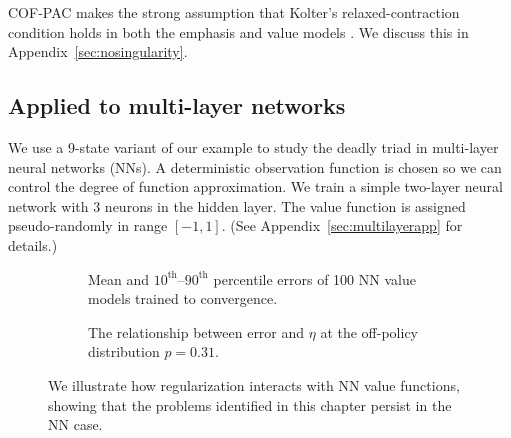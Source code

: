 COF-PAC makes the strong assumption that Kolter's relaxed-contraction condition \cite[eqn.~10]{kolter2011fixed} holds in both the emphasis and value models \cite[asm.~4]{zhang2020provably}. We discuss this in Appendix~\ref{sec:nosingularity}.


\subsection{Applied to multi-layer networks}
\label{sec:multilayer}

We use a 9-state variant of our example to study the deadly triad in multi-layer neural networks (NNs). A deterministic observation function is chosen so we can control the degree of function approximation. We train a simple two-layer neural network with 3 neurons in the hidden layer. The value function is assigned pseudo-randomly in range $[-1, 1]$. (See Appendix~\ref{sec:multilayerapp} for details.)

\begin{figure}
  \begin{subfigure}[t]{0.48\textwidth}
    \centering
    
    \caption{Mean and $10^\text{th}$--$90^\text{th}$ percentile errors of 100 NN value models trained to convergence. }
    \label{fig:mlperfdist}
  \end{subfigure}
  \hfill
  \begin{subfigure}[t]{0.48\textwidth}
    \centering
    
    \caption{The relationship between error and $\eta$ at the off-policy distribution $p=0.31$. }
    \label{fig:mlperfeta}
  \end{subfigure}
  \caption{We illustrate how regularization interacts with NN value functions, showing that the problems identified in this chapter persist in the NN case. }
\end{figure}

